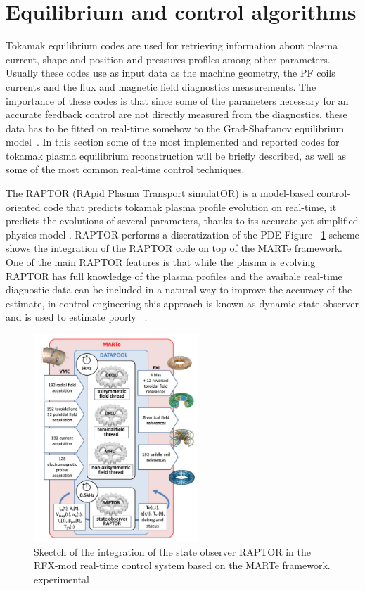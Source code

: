 \section{Equilibrium and control algorithms} 

Tokamak equilibrium codes are used for retrieving information about plasma current, shape and position and pressures profiles among other parameters. Usually these codes use as input data as the machine geometry, the PF coils currents and the flux and magnetic field diagnostics measurements. The importance of these codes is that since some of the parameters necessary for an accurate feedback control are not directly measured from the diagnostics,  these data has to be fitted on real-time somehow to the Grad-Shafranov equilibrium model~\cite{Shafranov1971}. In this section some of the most implemented and reported codes for tokamak plasma equilibrium reconstruction will be briefly  described, as well as some of the most common real-time control techniques. 
\smallskip 

The RAPTOR (RApid Plasma Transport simulatOR)  is a model-based control-oriented code that predicts tokamak plasma profile evolution on real-time, it predicts the evolutions of several parameters, thanks to its accurate yet simplified physics model \cite{Raptor}. RAPTOR performs a discratization of the PDE  Figure ~\ref{RaptorMARTe} scheme shows  the integration of the RAPTOR code on top of the MARTe framework. One of the main RAPTOR features is that  while the plasma is evolving RAPTOR has full knowledge of the plasma profiles and the avaibale real-time diagnostic data can be included in a natural way to improve the accuracy of the estimate, in control engineering this approach is known as dynamic state observer and is used to estimate poorly ~\cite{RAPTOR2011}.  ~\cite{RAPTOR2014}
\smallskip



\begin{figure}[htbp]
	\centering
	\includegraphics[width=0.55\textwidth]{Chp2/raptorMARTe.png}
	\caption{\label{RaptorMARTe} Skectch of the integration of the state observer RAPTOR in the RFX-mod real-time control system based on the MARTe framework.
		experimental \cite{Raptor}}
	
\end{figure}

